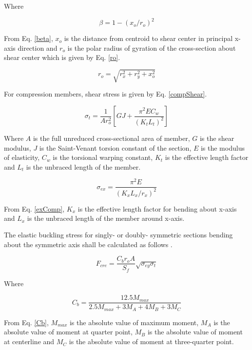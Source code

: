 \documentclass[twocolumn,10pt]{asme2e}
\begin{document}
Where 

\begin{equation}
\beta = 1 - (x_o/r_o)^2
\label{beta}
\end{equation}

From Eq. \ref{beta}, $x_o$ is the distance from centroid to shear center in principal x-axis direction and $r_o$ is the polar radius of gyration of the cross-section about shear center which is given by Eq. \ref{ro}.

\begin{equation}
r_o = \sqrt{r_x ^2 + r_y ^2 + x_o ^2}
\label{ro}
\end{equation}

For compression members, shear stress is given by Eq. \ref{compShear}.

\begin{equation}
\sigma _t =  \frac{1}{A r_o ^2} \left[G J + \frac{\pi ^2 E C_w}{(K_t L_t)^2} \right]
\label{compShear}
\end{equation}

Where $A$ is the full unreduced cross-sectional area of member, $G$ is the shear modulus, $J$ is the Saint-Venant torsion constant of the section, $E$ is the modulus of elasticity, $C_w$ is the torsional warping constant, $K_t$ is the effective length factor and $L_t$ is the unbraced length of the member.

\begin{equation}
\sigma _{ex} = \frac{\pi ^2 E}{(K_x L_x / r_x)^2}
\label{exComp}
\end{equation}

From Eq. \ref{exComp}, $K_x$ is the effective length factor for bending about x-axis and $L_x$ is the unbraced length of the member around x-axis.

The elastic buckling stress for singly- or doubly- symmetric sections bending about the symmetric axis shall be calculated as follows \cite{ASCE}.

\begin{equation}
	F_{cre} = \frac{C_b r_o A}{S_f} \sqrt{\sigma _{ey} \sigma _t}
\end{equation}

Where

\begin{equation}
C_b = \frac{12.5 M_{max}}{2.5 M_{max} + 3 M_A + 4 M_B + 3 M_C}
\label{Cb}
\end{equation}

From Eq. \ref{Cb}, $M_{max}$ is the absolute value of maximum moment, $M_A$ is the absolute value of moment at quarter point, $M_B$ is the absolute value of moment at centerline and $M_C$ is the absolute value of moment at three-quarter point.
\end{document}
